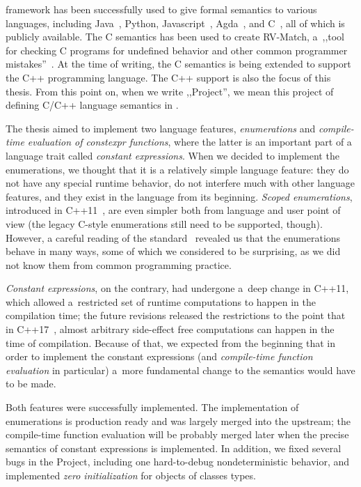 \documentclass[nolot,nolof,nocover,printed]{fithesis3}
\newcommand{\Project}{Project\xspace}
\begin{document}
\K framework has been successfully used to give formal semantics to various languages, including Java~\cite{bogdanas-rosu-2015-popl}, Python, Javascript~\cite{park-stefanescu-rosu-2015-pldi}, Agda~\cite{Tokarcik2015}, and C~\cite{ellison-2012-thesis,hathhorn-ellison-rosu-2015-pldi}, all of which is publicly available. The C semantics has been used to create RV-Match, a~,,tool for checking C programs for
undefined behavior and other common programmer mistakes''~\cite{guth-hathhorn-saxena-rosu-2016-cav}.  At the time of writing, the C semantics is being extended to support the C++ programming language. The C++ support is also the focus of this thesis. From this point on, when we write ,,\Project'', we mean this project of defining C/C++ language semantics in \K.

The thesis aimed to implement two language features, \textit{enumerations} and \textit{compile-time evaluation of constexpr functions}, where the latter is an important part of a language trait called \textit{constant expressions}. When we decided to implement the enumerations, we thought that it is a relatively simple language feature: they do not have any special runtime behavior, do not interfere much with other language features, and they exist in the language from its beginning. \textit{Scoped enumerations}, introduced in C++11~\cite{ISOcpp11}, are even simpler both from language and user point of view (the legacy C-style enumerations still need to be supported, though). However, a careful reading of the standard~\cite{n4296} revealed us that the enumerations behave in many ways, some of which we considered to be surprising, as we did not know them from common programming practice.

\textit{Constant expressions}, on the contrary, had undergone a~deep change in C++11, which allowed a~restricted set of runtime computations to happen in the compilation time; the future revisions released the restrictions to the point that in C++17~\cite{ISOcpp17}, almost arbitrary side-effect free computations can happen in the time of compilation. Because of that, we expected from the beginning that in order to implement the constant expressions (and \textit{compile-time function evaluation} in particular) a~more fundamental change to the semantics would have to be made.

Both features were successfully implemented. The implementation of enumerations is production ready and was largely merged into the upstream; the compile-time function evaluation 
will be probably merged later when the precise semantics of constant expressions is implemented. 
In addition, we fixed several bugs in the Project, including one hard-to-debug nondeterministic behavior, and implemented \textit{zero initialization} for objects of classes types.
\end{document}
